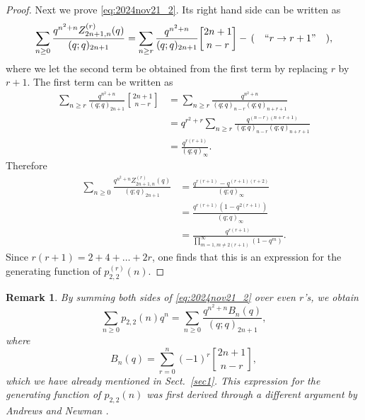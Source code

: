 \documentclass[sn-mathphys-num]{sn-jnl}%
\newcommand{\red}[1]{\textcolor{black}{#1}}
\theoremstyle{thmstyleone}%
\theoremstyle{thmstyletwo}%
\newtheorem{remark}{Remark}%
\theoremstyle{thmstylethree}%
\begin{document}
\begin{proof}
Next we prove \eqref{eq:2024nov21_2}.
Its right hand side can be written as
\begin{equation*}
\sum_{n \geq 0} \frac{q^{n^2+n} Z_{2n+1,n}^{(r)}(q)}{(q;q)_{2n+1}} =
\sum_{n \geq r} \frac{q^{n^2+n} }{(q;q)_{2n+1}} { 2n+1 \brack n-r } \\
- \, ( \quad ``r \rightarrow r + 1" \quad ),
\end{equation*}
where we let the second term be obtained from the first term
by replacing $r$ by $r +1$.
The first term can be written as
\red{
\begin{align}
\sum_{n \geq r} \frac{q^{n^2+n} }{(q;q)_{2n+1}} { 2n+1 \brack n-r }  &=
\sum_{n \geq r} \frac{q^{n^2+n} }{(q;q)_{n-r} (q;q)_{n+r+1}} \nonumber\\
&=q^{r^2+r}\sum_{n \geq r} \frac{q^{(n-r)(n+r+1)} }{(q;q)_{n-r} (q;q)_{n+r+1}} \nonumber\\
&= 
\frac{q^{r(r+1)}}{(q;q)_{\infty}}.\label{eq:2025june23_2}
\end{align}
}
Therefore
\begin{align*}
\sum_{n \geq 0} \frac{q^{n^2+n} Z_{2n+1,n}^{(r)}(q)}{(q;q)_{2n+1}} &=
\frac{q^{r(r+1)} - q^{(r+1)(r + 2)}}{(q;q)_{\infty}} \\
&= 
\frac{q^{r(r+1)}(1 - q^{2(r+1)})}{(q;q)_{\infty}} \\
&= \frac{q^{r(r+1)}}{\prod_{m=1, m \ne 2(r+1)}^\infty (1-q^m)}.
\end{align*}
Since $r(r+1) = 2 + 4 + \dots + 2 r$, one finds that
this is an expression for the generating function of $p^{(r)}_{2,2}(n)$.
\end{proof}


\begin{remark}
By summing both sides of \eqref{eq:2024nov21_2} over even $r$'s,
we obtain
\begin{equation}\label{eq:2024dec25_1}
\sum_{n \geq 0} p_{2,2}(n) q^n 
=  \sum_{n \geq 0} \frac{q^{n^2+n} B_n(q)}{(q;q)_{2n+1}},
\end{equation}
where
\begin{equation}\label{eq:2024july2_1}
B_n(q) = \sum_{r=0}^n (-1)^r {2n+1 \brack n-r},
\end{equation}
which we have already mentioned in Sect.~\ref{sec1}.
This expression for the generating function of $p_{2,2}(n)$ was first derived 
through a different argument by
Andrews and Newman \cite{AN2020}.
\end{remark}
\end{document}

